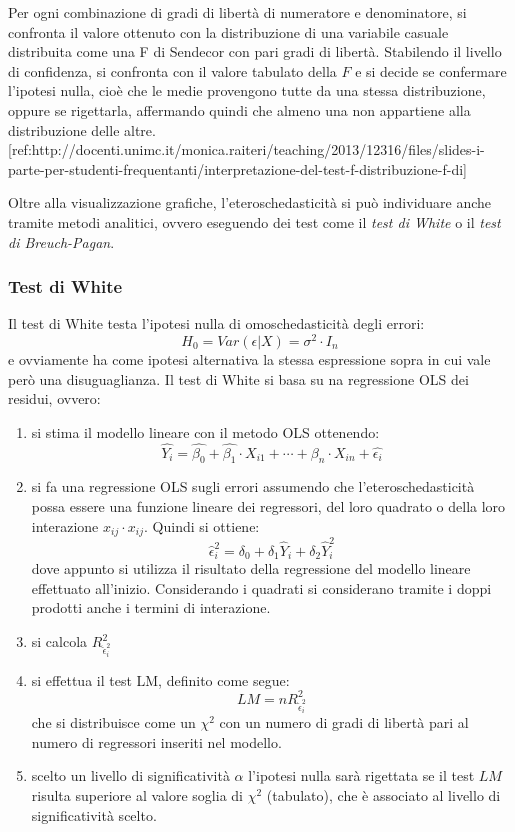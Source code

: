 \begin{tcolorbox}[colback=cyan!5!white, colframe=cyan!75!black, title = ANOVA]
	Per ogni combinazione di gradi di libertà di numeratore e denominatore, si confronta il valore ottenuto con la distribuzione di una variabile casuale distribuita come una F di Sendecor con pari gradi di libertà. Stabilendo il livello di confidenza, si confronta con il valore tabulato della $F$ e si decide se confermare l'ipotesi nulla, cioè che le medie provengono tutte da una stessa distribuzione, oppure se rigettarla, affermando quindi che almeno una non appartiene alla distribuzione delle altre.	
	[ref:http://docenti.unimc.it/monica.raiteri/teaching/2013/12316/files/slides-i-parte-per-studenti-frequentanti/interpretazione-del-test-f-distribuzione-f-di]
\end{tcolorbox}
Oltre alla visualizzazione grafiche, l'eteroschedasticità si può individuare anche tramite metodi analitici, ovvero eseguendo dei test come il \textit{test di White} o il \textit{test di Breuch-Pagan}.
\subsubsection{Test di White}
Il test di White testa l'ipotesi nulla di omoschedasticità degli errori:
\begin{equation}
H_0 = Var(\epsilon \vert X) = \sigma^2 \cdot I_n
\end{equation}
e ovviamente ha come ipotesi alternativa la stessa espressione sopra in cui vale però una disuguaglianza.
Il test di White si basa su na regressione OLS dei residui, ovvero:
\begin{enumerate}
	\item si stima il modello lineare con il metodo OLS ottenendo:
	\begin{equation}
	\hat{Y_i} = \hat{\beta_0} + \hat{\beta_1} \cdot X_{i1} + \cdots + \beta_n \cdot X_{in} + \hat{\epsilon_i}
	\end{equation}
	\item si fa una regressione OLS  sugli errori assumendo che l'eteroschedasticità possa essere una funzione lineare dei regressori, del loro quadrato o della loro interazione $x_{ij}\cdot x_{ij}$. Quindi si ottiene:
	\begin{equation}
	\hat{\epsilon}_i^2 = \delta_0 + \delta_1 \hat{Y}_i + \delta_2 \hat{Y}_i^2
	\end{equation}
	dove appunto si utilizza il risultato della regressione del modello lineare effettuato all'inizio. Considerando i quadrati si considerano tramite i doppi prodotti anche i termini di interazione.
	\item si calcola $R^2_{\hat{\epsilon}_i^2}$
	\item si effettua il test LM, definito come segue:
	\begin{equation}
	LM = nR^2_{\hat{\epsilon}_i^2}
	\end{equation}
	che si distribuisce come un $\chi^2$ con un numero di gradi di libertà pari al numero di regressori inseriti nel modello.
	\item scelto un livello di significatività $\alpha$ l'ipotesi nulla sarà rigettata se il test $LM$ risulta superiore al valore soglia di $\chi^2$ (tabulato), che è associato al livello di significatività scelto.
\end{enumerate}
